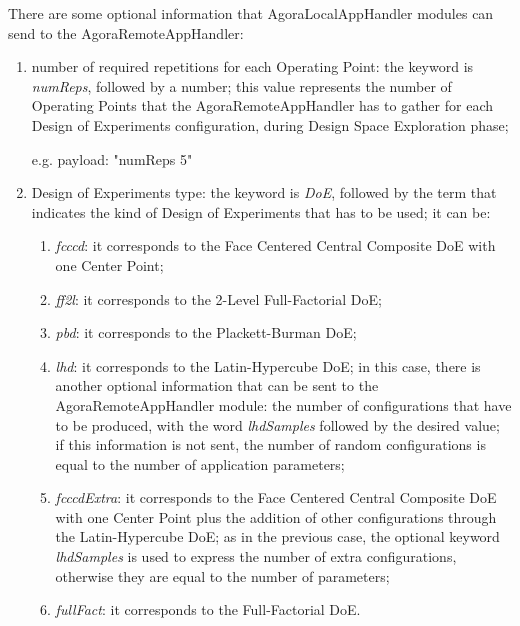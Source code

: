 There are some optional information that AgoraLocalAppHandler modules can send to the AgoraRemoteAppHandler:

\begin{enumerate}

    \item number of required repetitions for each Operating Point: the keyword is \textit{numReps}, followed by a number; this value represents the number of Operating Points that the AgoraRemoteAppHandler has to gather for each Design of Experiments configuration, during Design Space Exploration phase;
    
    e.g. payload: "numReps 5"
    
    \item Design of Experiments type: the keyword is \textit{DoE}, followed by the term that indicates the kind of Design of Experiments that has to be used; it can be:
    
    \begin{enumerate}
    
        \item \textit{fcccd}: it corresponds to the Face Centered Central Composite DoE with one Center Point;
        
        \item \textit{ff2l}: it corresponds to the 2-Level Full-Factorial DoE;
        
        \item \textit{pbd}: it corresponds to the Plackett-Burman DoE;
        
        \item \textit{lhd}: it corresponds to the Latin-Hypercube DoE; in this case, there is another optional information that can be sent to the AgoraRemoteAppHandler module: the number of configurations that have to be produced, with the word \textit{lhdSamples} followed by the desired value; if this information is not sent, the number of random configurations is equal to the number of application parameters;
        
        \item \textit{fcccdExtra}: it corresponds to the Face Centered Central Composite DoE with one Center Point plus the addition of other configurations through the Latin-Hypercube DoE; as in the previous case, the optional keyword \textit{lhdSamples} is used to express the number of extra configurations, otherwise they are equal to the number of parameters;
        
        \item \textit{fullFact}: it corresponds to the Full-Factorial DoE.
    

\end{enumerate}
\end{enumerate}
